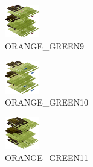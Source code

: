 \hspace{0.1cm}
\begin{minipage}[b]{0.15\linewidth}
\begin{figure}[H]                                                          
  \centering                                                             
  \begin{adjustbox}{width=1.5cm,center}                                   
  \includegraphics[width=1.5cm]{src/colorspace_colourflow/flows/colourflow_233-45.png}%
  \end{adjustbox}                                                        
\caption*{ORANGE\_GREEN9}                                           
\end{figure}                                                               
\end{minipage}
\hspace{0.1cm}
\begin{minipage}[b]{0.15\linewidth}
\begin{figure}[H]                                                          
  \centering                                                             
  \begin{adjustbox}{width=1.5cm,center}                                   
  \includegraphics[width=1.5cm]{src/colorspace_colourflow/flows/colourflow_234-45.png}%
  \end{adjustbox}                                                        
\caption*{ORANGE\_GREEN10}                                           
\end{figure}                                                               
\end{minipage}
\hspace{0.1cm}
\begin{minipage}[b]{0.15\linewidth}
\begin{figure}[H]                                                          
  \centering                                                             
  \begin{adjustbox}{width=1.5cm,center}                                   
  \includegraphics[width=1.5cm]{src/colorspace_colourflow/flows/colourflow_235-45.png}%
  \end{adjustbox}                                                        
\caption*{ORANGE\_GREEN11}                                           
\end{figure}                                                               
\end{minipage}
